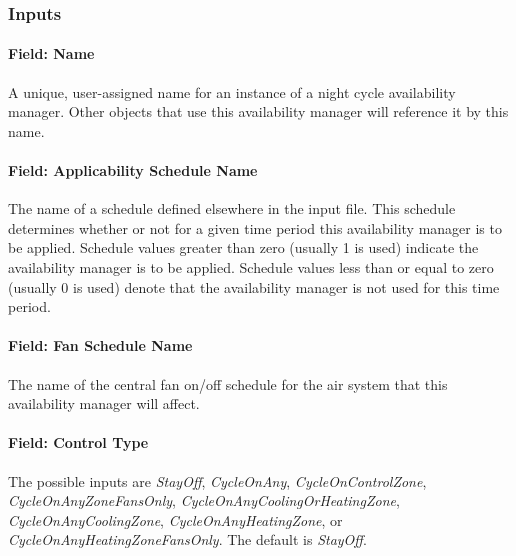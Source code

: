 \subsubsection{Inputs}\label{inputs-3-037}

\paragraph{Field: Name}\label{field-name-2-030}

A unique, user-assigned name for an instance of a night cycle availability manager. Other objects that use this availability manager will reference it by this name.

\paragraph{Field: Applicability Schedule Name}\label{field-applicability-schedule-name}

The name of a schedule defined elsewhere in the input file. This schedule determines whether or not for a given time period this availability manager is to be applied. Schedule values greater than zero (usually 1 is used) indicate the availability manager is to be applied. Schedule values less than or equal to zero (usually 0 is used) denote that the availability manager is not used for this time period.

\paragraph{Field: Fan Schedule Name}\label{field-fan-schedule-name}

The name of the central fan on/off schedule for the air system that this availability manager will affect.

\paragraph{Field: Control Type}\label{field-control-type}

The possible inputs are \emph{StayOff}, \emph{CycleOnAny}, \emph{CycleOnControlZone}, \emph{CycleOnAnyZoneFansOnly}, \emph{CycleOnAnyCoolingOrHeatingZone}, \emph{CycleOnAnyCoolingZone}, \emph{CycleOnAnyHeatingZone}, or \emph{CycleOnAnyHeatingZoneFansOnly}. The default is \emph{StayOff}.

